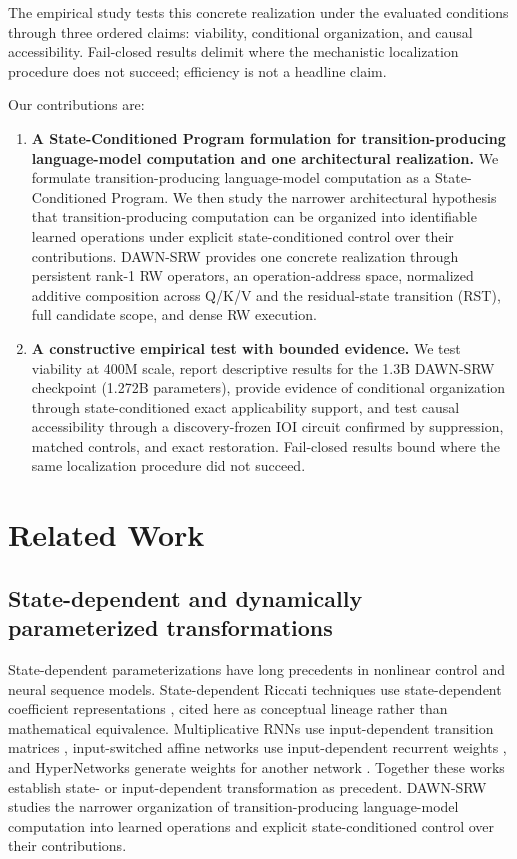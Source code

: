\documentclass{article}
\newcommand{\DAWN}{DAWN-SRW}
\begin{document}
The empirical study tests this concrete realization under the evaluated
conditions through three ordered claims: viability, conditional organization,
and causal accessibility. Fail-closed results delimit where the mechanistic
localization procedure does not succeed; efficiency is not a headline claim.

Our contributions are:
\begin{enumerate}
    \item \textbf{A State-Conditioned Program formulation for
    transition-producing language-model computation and one architectural
    realization.} We formulate transition-producing language-model computation
    as a State-Conditioned Program. We then study the narrower architectural
    hypothesis that transition-producing computation can be organized into
    identifiable learned operations under explicit state-conditioned control over
    their contributions. \DAWN{} provides one concrete realization through persistent
    rank-1 RW operators, an operation-address space, normalized additive
    composition across Q/K/V and the residual-state transition (RST), full
    candidate scope, and dense RW execution.
    \item \textbf{A constructive empirical test with bounded evidence.} We test
    viability at 400M scale, report descriptive results for the 1.3B \DAWN{}
    checkpoint (1.272B parameters), provide evidence of conditional organization
    through state-conditioned exact applicability support, and test causal
    accessibility through a discovery-frozen IOI circuit confirmed by
    suppression, matched controls, and exact restoration. Fail-closed results
    bound where the same localization procedure did not succeed.
\end{enumerate}

\section{Related Work}
\label{sec:related}

\subsection{State-dependent and dynamically parameterized transformations}

State-dependent parameterizations have long precedents in nonlinear control and
neural sequence models. State-dependent Riccati techniques use state-dependent
coefficient representations \cite{cloutier1997state}, cited here as conceptual
lineage rather than mathematical equivalence. Multiplicative RNNs use
input-dependent transition matrices \cite{sutskever2011generating},
input-switched affine networks use input-dependent recurrent weights
\cite{foerster2017input}, and HyperNetworks generate weights for another network
\cite{ha2017hypernetworks}. Together these works establish state- or
input-dependent transformation as precedent. \DAWN{} studies the narrower
organization of transition-producing language-model computation into learned
operations and explicit state-conditioned control over their contributions.
\end{document}

